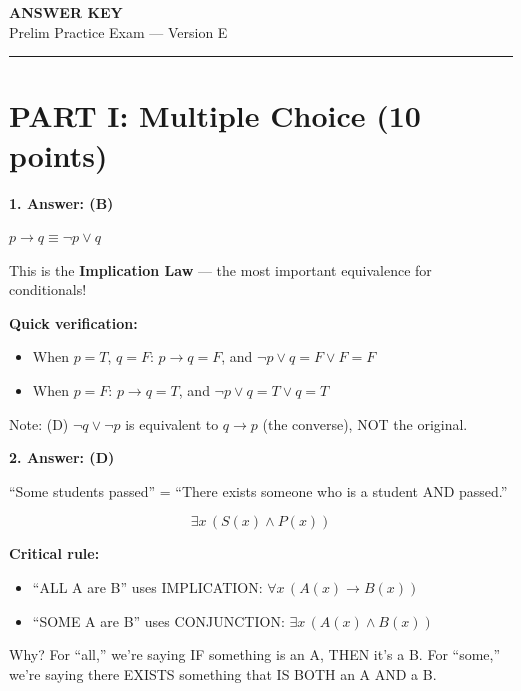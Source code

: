 \documentclass[11pt,a4paper]{article}
\begin{document}
\begin{center}
{\LARGE\textbf{ANSWER KEY}}\\[5pt]
{\Large Prelim Practice Exam --- Version E}\\[10pt]
\rule{0.8\textwidth}{0.5pt}
\end{center}

\vspace{15pt}

\section*{PART I: Multiple Choice (10 points)}

\textbf{1. Answer: (B)}

\begin{solnbox}
$p \to q \equiv \neg p \lor q$

This is the \textbf{Implication Law} --- the most important equivalence for conditionals!

\textbf{Quick verification:}
\begin{itemize}[noitemsep]
    \item When $p = T$, $q = F$: $p \to q = F$, and $\neg p \lor q = F \lor F = F$ \checkmark
    \item When $p = F$: $p \to q = T$, and $\neg p \lor q = T \lor q = T$ \checkmark
\end{itemize}

Note: (D) $\neg q \lor \neg p$ is equivalent to $q \to p$ (the converse), NOT the original.
\end{solnbox}

\vspace{10pt}

\textbf{2. Answer: (D)}

\begin{solnbox}
``Some students passed'' = ``There exists someone who is a student AND passed.''

$$\exists x\, (S(x) \land P(x))$$

\textbf{Critical rule:}
\begin{itemize}[noitemsep]
    \item ``ALL A are B'' uses IMPLICATION: $\forall x\, (A(x) \to B(x))$
    \item ``SOME A are B'' uses CONJUNCTION: $\exists x\, (A(x) \land B(x))$
\end{itemize}

Why? For ``all,'' we're saying IF something is an A, THEN it's a B. For ``some,'' we're saying there EXISTS something that IS BOTH an A AND a B.
\end{solnbox}
\end{document}
